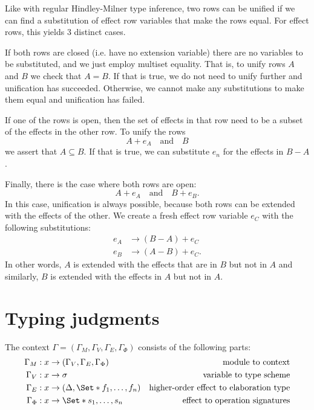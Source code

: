 Like with regular Hindley-Milner type inference, two rows can be unified if we can find a substitution of effect row variables that make the rows equal. For effect rows, this yields 3 distinct cases.

If both rows are closed (i.e. have no extension variable) there are no variables to be substituted, and we just employ multiset equality. That is, to unify rows $A$ and $B$ we check that $A = B$. If that is true, we do not need to unify further and unification has succeeded. Otherwise, we cannot make any substitutions to make them equal and unification has failed.

If one of the rows is open, then the set of effects in that row need to be a subset of the effects in the other row. To unify the rows
\[ A + e_A \quad\text{and}\quad B \]
we assert that $A \subseteq B$. If that is true, we can substitute $e_n$ for the effects in $B - A$.

Finally, there is the case where both rows are open:
\[ A + e_A \quad\text{and}\quad B + e_B. \]
In this case, unification is always possible, because both rows can be extended with the effects of the other. We create a fresh effect row variable $e_C$ with the following substitutions:
\begin{align*}
    e_A &\to (B - A) + e_C \\
    e_B &\to (A - B) + e_C.
\end{align*}
In other words, $A$ is extended with the effects that are in $B$ but not in $A$ and similarly, $B$ is extended with the effects in $A$ but not in $A$.

\section{Typing judgments}

The context $\Gamma = (\Gamma_M, \Gamma_V, \Gamma_E, \Gamma_\Phi)$ consists of the following parts:
\begin{align*}
    \Gamma_M &: x \to (\Gamma_V, \Gamma_E, \Gamma_\Phi) & \text{module to context}\\
    \Gamma_V &: x \to \sigma & \text{variable to type scheme}\\
    \Gamma_E &: x \to (\Delta, \S{f_1, \dots, f_n}) & \text{higher-order effect to elaboration type}\\
    \Gamma_\Phi &: x \to \S{s_1,\dots,s_n} & \text{effect to operation signatures}
\end{align*}


